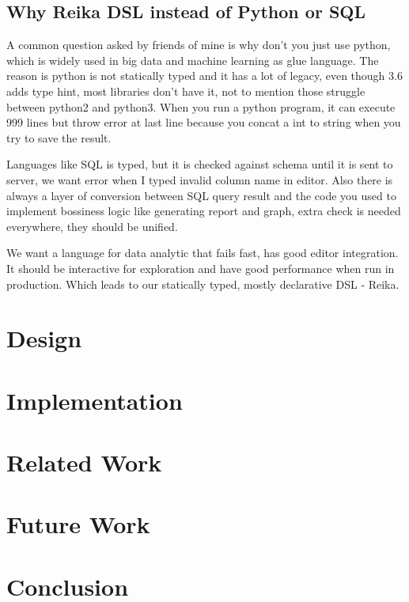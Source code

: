 \documentclass{article}
\begin{document}
\subsection{Why Reika DSL instead of Python or SQL}
\label{subsec:why-reika}

A common question asked by friends of mine is why don't you just use python,
which is widely used in big data and machine learning as glue language.
The reason is python is not statically typed and it has a lot of legacy,
even though 3.6 adds type hint, most libraries don't have it, not to mention those struggle between python2 and python3.
When you run a python program,
it can execute 999 lines but throw error at last line because you concat a int to string when you try to save the result.

Languages like SQL is typed, but it is checked against schema until it is sent to server,
we want error when I typed invalid column name in editor.
Also there is always a layer of conversion between SQL query result and the code you used to implement bossiness logic
like generating report and graph, extra check is needed everywhere, they should be unified.

We want a language for data analytic that fails fast, has good editor integration.
It should be interactive for exploration and have good performance when run in production.
Which leads to our statically typed, mostly declarative DSL - Reika.

\section{Design}
\label{sec:design}


\section{Implementation}
\label{sec:implementation}


\section{Related Work}
\label{sec:related-work}


\section{Future Work}
\label{sec:future-work}

\section{Conclusion}
\label{sec:conclusion}

\printbibliography
\end{document}
